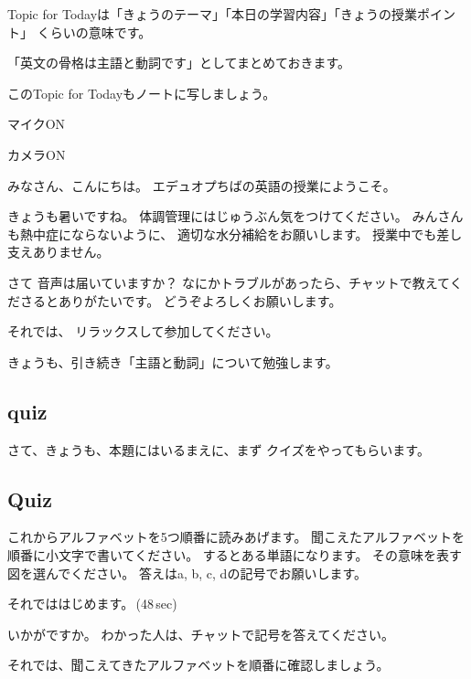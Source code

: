\documentclass[12pt]{jlreq}
\newenvironment{my_check}
  {\begin{itemize}
    \renewcommand\labelitemi{$\square\hspace{0.5em}$}} %
  {\end{itemize}}
\begin{document}
Topic for Todayは「きょうのテーマ」「本日の学習内容」「きょうの授業ポイント」
くらいの意味です。

「英文の骨格は主語と動詞です」としてまとめておきます。

このTopic for Todayもノートに写しましょう。

\newpage
\begin{my_check}
\item マイクON
\item カメラON
\end{my_check}

{\LARGE \ComputerMouse}

みなさん、こんにちは。
エデュオプちばの英語の授業にようこそ。

きょうも暑いですね。
体調管理にはじゅうぶん気をつけてください。
みんさんも熱中症にならないように、
適切な水分補給をお願いします。
授業中でも差し支えありません。

さて
音声は届いていますか？
なにかトラブルがあったら、チャットで教えてくださるとありがたいです。
どうぞよろしくお願いします。

それでは、
リラックスして参加してください。

きょうも、引き続き「主語と動詞」について勉強します。

{\large \ComputerMouse}



\subsection{quiz}
さて、きょうも、本題にはいるまえに、まず
クイズをやってもらいます。

{\large \ComputerMouse}

\subsection{Quiz}

これからアルファベットを5つ順番に読みあげます。
聞こえたアルファベットを順番に小文字で書いてください。
するとある単語になります。
その意味を表す図を選んでください。
答えはa, b, c, dの記号でお願いします。


それでははじめます。\faVolumeUp\,(48\,sec)

いかがですか。
わかった人は、チャットで記号を答えてください。

それでは、聞こえてきたアルファベットを順番に確認しましょう。{\large \ComputerMouse}
\end{document}

